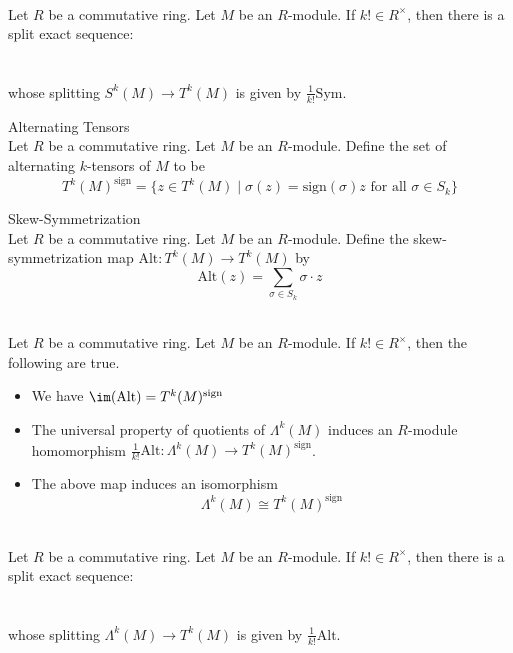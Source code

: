 \documentclass[a4paper]{article}
\begin{document}
\begin{prp}{}{}\\
Let $R$ be a commutative ring. Let $M$ be an $R$-module. If $k!\in R^\times$, then there is a split exact sequence: \\~\\
\\
whose splitting $S^k(M)\to T^k(M)$ is given by $\frac{1}{k!}\text{Sym}$. 
\end{prp}

\begin{defn}{Alternating Tensors}{}\\
Let $R$ be a commutative ring. Let $M$ be an $R$-module. Define the set of alternating $k$-tensors of $M$ to be $$T^k(M)^\text{sign}=\{z\in T^k(M)\;|\;\sigma(z)=\text{sign}(\sigma)z\text{ for all }\sigma\in S_k\}$$
\end{defn}

\begin{defn}{Skew-Symmetrization}{}\\
Let $R$ be a commutative ring. Let $M$ be an $R$-module. Define the skew-symmetrization map $\text{Alt}:T^k(M)\to T^k(M)$ by $$\text{Alt}(z)=\sum_{\sigma\in S_k}\sigma\cdot z$$
\end{defn}

\begin{lmm}{}{}\\
Let $R$ be a commutative ring. Let $M$ be an $R$-module. If $k!\in R^\times$, then the following are true. 
\begin{itemize}
\item We have $\im(\text{Alt})=T^k(M)^\text{sign}$
\item The universal property of quotients of $\Lambda^k(M)$ induces an $R$-module homomorphism $\frac{1}{k!}\text{Alt}:\Lambda^k(M)\to T^k(M)^\text{sign}$. 
\item The above map induces an isomorphism $$\Lambda^k(M)\cong T^k(M)^\text{sign}$$
\end{itemize}
\end{lmm}

\begin{prp}{}{}\\
Let $R$ be a commutative ring. Let $M$ be an $R$-module. If $k!\in R^\times$, then there is a split exact sequence: \\~\\
\\
whose splitting $\Lambda^k(M)\to T^k(M)$ is given by $\frac{1}{k!}\text{Alt}$. 
\end{prp}
\end{document}
